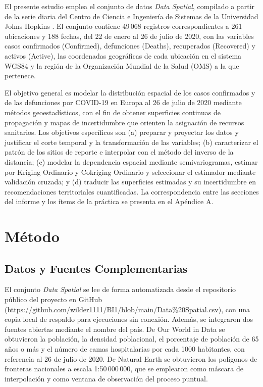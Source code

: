 \documentclass[12pt,a4paper]{article}
\begin{document}
El presente estudio emplea el conjunto de datos \emph{Data Spatial}, compilado a partir de la serie diaria del Centro de Ciencia e Ingeniería de Sistemas de la Universidad Johns Hopkins \citep{dong2020}. El conjunto contiene 49\,068 registros correspondientes a 261 ubicaciones y 188 fechas, del 22 de enero al 26 de julio de 2020, con las variables casos confirmados (Confirmed), defunciones (Deaths), recuperados (Recovered) y activos (Active), las coordenadas geográficas de cada ubicación en el sistema WGS84 y la región de la Organización Mundial de la Salud (OMS) a la que pertenece.

El objetivo general es modelar la distribución espacial de los casos confirmados y de las defunciones por COVID-19 en Europa al 26 de julio de 2020 mediante métodos geoestadísticos, con el fin de obtener superficies continuas de propagación y mapas de incertidumbre que orienten la asignación de recursos sanitarios. Los objetivos específicos son (a) preparar y proyectar los datos y justificar el corte temporal y la transformación de las variables; (b) caracterizar el patrón de los sitios de reporte e interpolar con el método del inverso de la distancia; (c) modelar la dependencia espacial mediante semivariogramas, estimar por Kriging Ordinario y Cokriging Ordinario y seleccionar el estimador mediante validación cruzada; y (d) traducir las superficies estimadas y su incertidumbre en recomendaciones territoriales cuantificadas. La correspondencia entre las secciones del informe y los ítems de la práctica se presenta en el Apéndice A.

\section{Método}

\subsection{Datos y Fuentes Complementarias}

El conjunto \emph{Data Spatial} se lee de forma automatizada desde el repositorio público del proyecto en GitHub (\url{https://github.com/wilder1111/BI1/blob/main/Data%20Spatial.csv}), con una copia local de respaldo para ejecuciones sin conexión. Además, se integraron dos fuentes abiertas mediante el nombre del país. De Our World in Data \citep{owid2020} se obtuvieron la población, la densidad poblacional, el porcentaje de población de 65 años o más y el número de camas hospitalarias por cada 1000 habitantes, con referencia al 26 de julio de 2020. De Natural Earth \citep{naturalearth} se obtuvieron los polígonos de fronteras nacionales a escala 1:50\,000\,000, que se emplearon como máscara de interpolación y como ventana de observación del proceso puntual.
\end{document}
